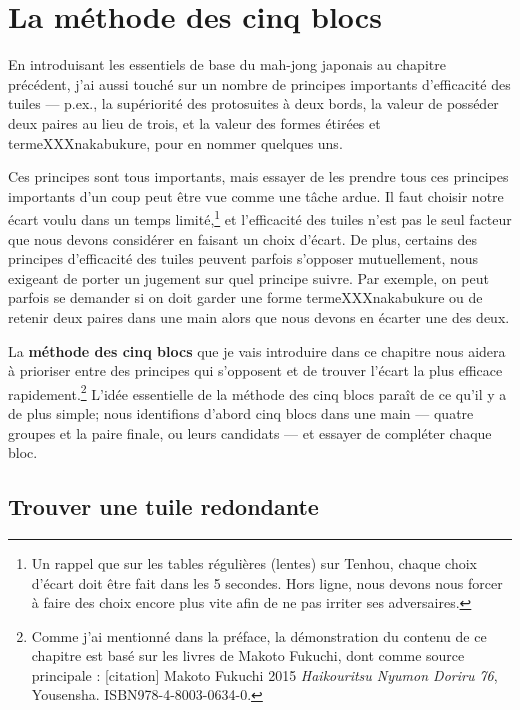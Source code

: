 
\chapter{La méthode des cinq blocs} \label{ch:five}
\thispagestyle{empty}

En introduisant les essentiels de base du mah-jong japonais au chapitre précédent, j'ai aussi touché sur un nombre de principes importants d'efficacité des tuiles --- p.ex., la supériorité des protosuites à deux bords, la valeur de posséder deux paires au lieu de trois, et la valeur des formes étirées et termeXXXnakabukure, pour en nommer quelques uns. 

\bigskip
Ces principes sont tous importants, mais essayer de les prendre tous ces principes importants d'un coup peut être vue comme une tâche ardue. Il faut choisir notre écart voulu dans un temps limité,\footnote{Un rappel que sur les tables régulières (lentes) sur {\jap Tenhou}, chaque choix d'écart doit être fait dans les 5 secondes. Hors ligne, nous devons nous forcer à faire des choix encore plus vite afin de ne pas irriter ses adversaires.} et l'efficacité des tuiles n'est pas le seul facteur que nous devons considérer en faisant un choix d'écart. 
De plus, certains des principes d'efficacité des tuiles peuvent parfois s'opposer mutuellement, nous exigeant de porter un jugement sur quel principe suivre. Par exemple, on peut parfois se demander si on doit garder une forme termeXXXnakabukure ou de retenir deux paires dans une main alors que nous devons en écarter une des deux. 

\bigskip
La {\bf méthode des cinq blocs} que je vais introduire dans ce chapitre nous aidera à prioriser entre des principes qui s'opposent et de trouver l'écart la plus efficace rapidement.\footnote{Comme j'ai mentionné dans la préface, la démonstration du contenu de ce chapitre est basé sur les livres de Makoto Fukuchi, dont comme source principale : [citation] Makoto Fukuchi 2015 \textit{Haikouritsu Nyumon Doriru 76}, Yousensha. ISBN978-4-8003-0634-0.}
L'idée essentielle de la méthode des cinq blocs paraît de ce qu'il y a de plus simple; nous identifions d'abord cinq blocs dans une main --- quatre groupes et la paire finale, ou leurs candidats --- et essayer de compléter chaque bloc. 

\section{Trouver une tuile redondante} 

